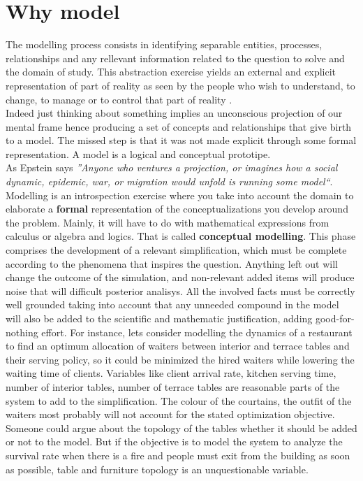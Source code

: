 \documentclass[11pt,oneside,a4paper,openright]{report}
\begin{document}
\section{Why model}
%
The modelling process consists in identifying separable entities, processes, relationships and any rellevant information related to the question to solve and the domain of study. 
This abstraction exercise yields an external and explicit representation of part of reality as seen by the
people who wish to understand, to change, to manage or to control that part of reality \cite{Pidd2003}.\\
Indeed just thinking about something implies an unconscious projection of our mental frame hence producing a set of concepts and relationships that give birth to a model. The missed step is that it was not made explicit through some formal representation. A model is a logical and conceptual prototipe.\\
As Epstein \cite[p.1]{Epstein2008} says \textit{''Anyone who ventures a projection, or imagines how a social dynamic, epidemic, war, or migration would unfold is running some model``}.\\
Modelling is an introspection exercise where you take into account the domain to elaborate a \textbf{formal} representation of the conceptualizations you develop around the problem. Mainly, it will have to do with mathematical expressions from calculus or algebra and logics. That is called \textbf{conceptual modelling}. This phase comprises the development of a relevant simplification, which must be complete according to the phenomena that inspires the question. Anything left out will change the outcome of the simulation, and non-relevant added items will produce noise that will difficult posterior analisys. All the involved facts must be correctly well grounded taking into account that any unneeded compound in the model will also be added to the scientific and mathematic justification, adding good-for-nothing effort.
For instance, lets consider modelling the dynamics of a restaurant to find an optimum allocation of waiters between interior and terrace tables and their serving policy, so it could be minimized the hired waiters while lowering the waiting time of clients. Variables like client arrival rate, kitchen serving time, number of interior tables, number of terrace tables are reasonable parts of the system to add to the simplification. The colour of the courtains, the outfit of the waiters most probably will not account for the stated optimization objective. Someone could argue about the topology of the tables whether it should be added or not to the model. But if the objective is to model the system to analyze the survival rate when there is a fire and people must exit from the building as soon as possible, table and furniture topology is an unquestionable variable.\\
\end{document}
